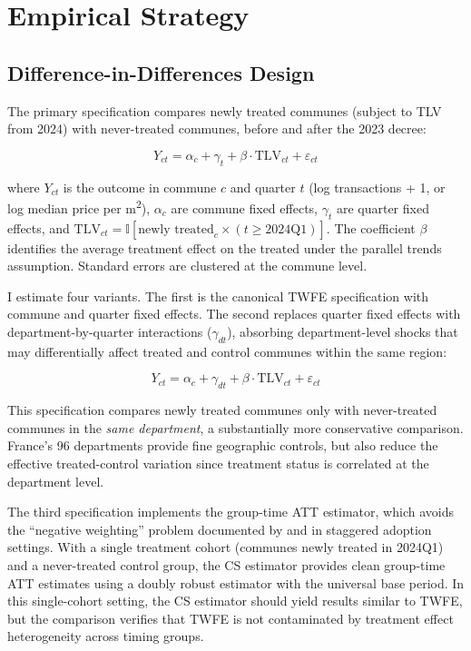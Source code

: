 \documentclass[12pt]{article}
\newcommand{\ind}{\mathbb{I}}
\begin{document}
\section{Empirical Strategy}\label{sec:strategy}

\subsection{Difference-in-Differences Design}

The primary specification compares newly treated communes (subject to TLV from 2024) with never-treated communes, before and after the 2023 decree:

\begin{equation}\label{eq:did}
Y_{ct} = \alpha_c + \gamma_t + \beta \cdot \text{TLV}_{ct} + \varepsilon_{ct}
\end{equation}

\noindent where $Y_{ct}$ is the outcome in commune $c$ and quarter $t$ (log transactions + 1, or log median price per m\textsuperscript{2}), $\alpha_c$ are commune fixed effects, $\gamma_t$ are quarter fixed effects, and $\text{TLV}_{ct} = \ind[\text{newly treated}_c \times (t \geq 2024\text{Q1})]$. The coefficient $\beta$ identifies the average treatment effect on the treated under the parallel trends assumption. Standard errors are clustered at the commune level.

I estimate four variants. The first is the canonical TWFE specification with commune and quarter fixed effects. The second replaces quarter fixed effects with department-by-quarter interactions ($\gamma_{dt}$), absorbing department-level shocks that may differentially affect treated and control communes within the same region:

\begin{equation}\label{eq:did2}
Y_{ct} = \alpha_c + \gamma_{dt} + \beta \cdot \text{TLV}_{ct} + \varepsilon_{ct}
\end{equation}

\noindent This specification compares newly treated communes only with never-treated communes in the \textit{same department}, a substantially more conservative comparison. France's 96 departments provide fine geographic controls, but also reduce the effective treated-control variation since treatment status is correlated at the department level.

The third specification implements the \citet{callaway2021difference} group-time ATT estimator, which avoids the ``negative weighting'' problem documented by \citet{goodmanbacon2021difference} and \citet{dechaisemartin2020two} in staggered adoption settings. With a single treatment cohort (communes newly treated in 2024Q1) and a never-treated control group, the CS estimator provides clean group-time ATT estimates using a doubly robust estimator with the universal base period. In this single-cohort setting, the CS estimator should yield results similar to TWFE, but the comparison verifies that TWFE is not contaminated by treatment effect heterogeneity across timing groups.
\end{document}
